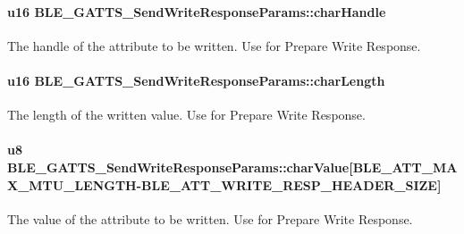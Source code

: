 \paragraph[{\texorpdfstring{char\+Handle}{charHandle}}]{\setlength{\rightskip}{0pt plus 5cm}u16 B\+L\+E\+\_\+\+G\+A\+T\+T\+S\+\_\+\+Send\+Write\+Response\+Params\+::char\+Handle}\hypertarget{struct_b_l_e___g_a_t_t_s___send_write_response_params_a84553233f6ccb5545f39b685701c5de3}{}\label{struct_b_l_e___g_a_t_t_s___send_write_response_params_a84553233f6ccb5545f39b685701c5de3}
The handle of the attribute to be written. Use for Prepare Write Response. 
\paragraph[{\texorpdfstring{char\+Length}{charLength}}]{\setlength{\rightskip}{0pt plus 5cm}u16 B\+L\+E\+\_\+\+G\+A\+T\+T\+S\+\_\+\+Send\+Write\+Response\+Params\+::char\+Length}\hypertarget{struct_b_l_e___g_a_t_t_s___send_write_response_params_a47fc7776a87691c4a4c904360bbb1676}{}\label{struct_b_l_e___g_a_t_t_s___send_write_response_params_a47fc7776a87691c4a4c904360bbb1676}
The length of the written value. Use for Prepare Write Response. 
\paragraph[{\texorpdfstring{char\+Value}{charValue}}]{\setlength{\rightskip}{0pt plus 5cm}u8 B\+L\+E\+\_\+\+G\+A\+T\+T\+S\+\_\+\+Send\+Write\+Response\+Params\+::char\+Value\mbox{[}{\bf B\+L\+E\+\_\+\+A\+T\+T\+\_\+\+M\+A\+X\+\_\+\+M\+T\+U\+\_\+\+L\+E\+N\+G\+TH}-\/{\bf B\+L\+E\+\_\+\+A\+T\+T\+\_\+\+W\+R\+I\+T\+E\+\_\+\+R\+E\+S\+P\+\_\+\+H\+E\+A\+D\+E\+R\+\_\+\+S\+I\+ZE}\mbox{]}}\hypertarget{struct_b_l_e___g_a_t_t_s___send_write_response_params_a4e13604ab12673ec85fa6507c56eb5ad}{}\label{struct_b_l_e___g_a_t_t_s___send_write_response_params_a4e13604ab12673ec85fa6507c56eb5ad}
The value of the attribute to be written. Use for Prepare Write Response. 
